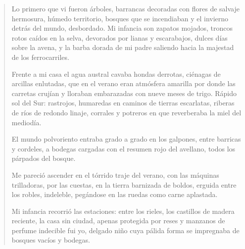 \documentclass[12pt]{article}
\begin{document}
\clearpage
{}
\begin{verse}
Lo primero que vi fueron árboles, barrancas  
decoradas con flores de salvaje hermosura,  
húmedo territorio, bosques que se incendiaban  
y el invierno detrás del mundo, desbordado.  
Mi infancia son zapatos mojados, troncos rotos  
caídos en la selva, devorados por lianas  
y escarabajos, dulces días sobre la avena,  
y la barba dorada de mi padre saliendo  
hacia la majestad de los ferrocarriles.  
	
 Frente a mi casa el agua austral cavaba  
 hondas derrotas, ciénagas de arcillas enlutadas,  
 que en el verano eran atmósfera amarilla  
 por donde las carretas crujían y lloraban  
 embarazadas con nueve meses de trigo.  
 Rápido sol del Sur:  
 rastrojos, humaredas  
 en caminos de tierras escarlatas, riberas  
 de ríos de redondo linaje, corrales y potreros  
 en que reverberaba la miel del mediodía.  
	 
 El mundo polvoriento entraba grado a grado  
 en los galpones, entre barricas y cordeles,  
 a bodegas cargadas con el resumen rojo  
 del avellano, todos los párpados del bosque.  
	
Me pareció ascender en el tórrido traje  
del verano, con las máquinas trilladoras,  
por las cuestas, en la tierra barnizada de boldos,  
erguida entre los robles, indeleble,  
pegándose en las ruedas como carne aplastada.  
	
 Mi infancia recorrió las estaciones: entre  
 los rieles, los castillos de madera reciente,  
 la casa sin ciudad, apenas protegida  
 por reses y manzanos de perfume indecible  
 fui yo, delgado niño cuya pálida forma  
 se impregnaba de bosques vacíos y bodegas.  

\end{verse}
\end{document}

